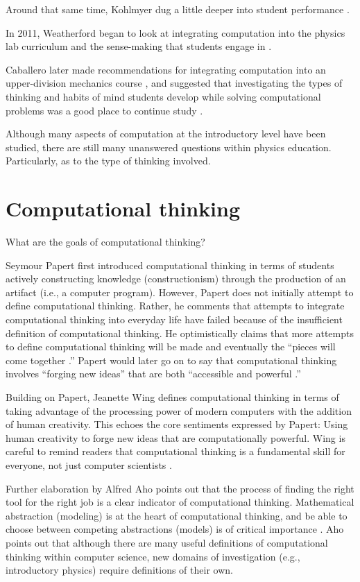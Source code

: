 \documentclass{msuphddissertation}
\begin{document}
\begin{doublespace}
Around that same time, Kohlmyer dug a little deeper into student performance \cite{Kohlmyer2005}.

In 2011, Weatherford began to look at integrating computation into the physics lab curriculum and the sense-making that students engage in \cite{Weatherford2011}.  

Caballero later made recommendations for integrating computation into an upper-division mechanics course \cite{Caballero2014}, and suggested that investigating the types of thinking and habits of mind students develop while solving computational problems was a good place to continue study \cite{Caballero2011}.

Although many aspects of computation at the introductory level have been studied, there are still many unanswered questions within physics education.  Particularly, as to the type of thinking involved.

\section{Computational thinking}

What are the goals of computational thinking?

Seymour Papert first introduced computational thinking in terms of students actively constructing knowledge (constructionism) through the production of an artifact (i.e., a computer program).  However, Papert does not initially attempt to define computational thinking.  Rather, he comments that attempts to integrate computational thinking into everyday life have failed because of the insufficient definition of computational thinking.  He optimistically claims that more attempts to define computational thinking will be made and eventually the ``pieces will come together \cite{Papert1981}.''  Papert would later go on to say that computational thinking involves ``forging new ideas'' that are both ``accessible and powerful \cite{Papert1996}.''

Building on Papert, Jeanette Wing defines computational thinking in terms of taking advantage of the processing power of modern computers with the addition of human creativity.  This echoes the core sentiments expressed by Papert: Using human creativity to forge new ideas that are computationally powerful.  Wing is careful to remind readers that computational thinking is a fundamental skill for everyone, not just computer scientists \cite{Wing2008}.

Further elaboration by Alfred Aho points out that the process of finding the right tool for the right job is a clear indicator of computational thinking.  Mathematical abstraction (modeling) is at the heart of computational thinking, and be able to choose between competing abstractions (models) is of critical importance \cite{Aho2012}.  Aho points out that although there are many useful definitions of computational thinking within computer science, new domains of investigation (e.g., introductory physics) require definitions of their own.


\end{doublespace}
\end{document}
